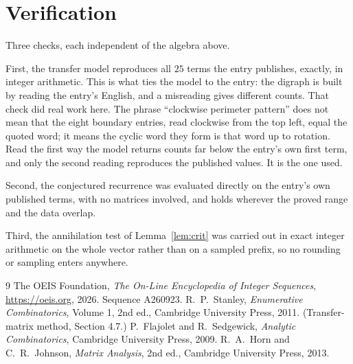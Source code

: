 \documentclass[11pt,a4paper]{article}
\theoremstyle{plain}
\theoremstyle{definition}
\begin{document}
\section{Verification}

Three checks, each independent of the algebra above.

First, the transfer model reproduces all $25$ terms the entry publishes, exactly, in
integer arithmetic. This is what ties the model to the entry: the digraph is built by reading
the entry's English, and a misreading gives different counts. That check did real work here. The phrase ``clockwise perimeter pattern'' does not mean that the eight boundary entries, read clockwise from the top left, equal the quoted word; it means the cyclic word they form is that word up to rotation. Read the first way the model returns counts far below the entry's own first term, and only the second reading reproduces the published values. It is the one used.

Second, the conjectured recurrence was evaluated directly on the entry's own published terms,
with no matrices involved, and holds wherever the proved range and the data overlap.

Third, the annihilation test of Lemma~\ref{lem:crit} was carried out in exact integer
arithmetic on the whole vector rather than on a sampled prefix, so no rounding or sampling
enters anywhere.

\begin{thebibliography}{9}
 The OEIS Foundation, \emph{The On-Line Encyclopedia of Integer
Sequences}, \url{https://oeis.org}, 2026. Sequence A260923.
 R.~P.~Stanley, \emph{Enumerative Combinatorics}, Volume 1, 2nd ed.,
Cambridge University Press, 2011. (Transfer-matrix method, Section 4.7.)
 P.~Flajolet and R.~Sedgewick, \emph{Analytic Combinatorics}, Cambridge
University Press, 2009.
 R.~A.~Horn and C.~R.~Johnson, \emph{Matrix Analysis}, 2nd ed., Cambridge
University Press, 2013.
\end{thebibliography}
\end{document}
